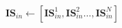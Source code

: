 \documentclass[10pt,twocolumn,letterpaper]{article}
\begin{document}
$\mathbf{IS}_{in} \gets [\mathbf{IS}_{in}^{1},\mathbf{IS}_{in}^{2} \dots, \mathbf{IS}_{in}^{N}]$%
\end{document}
